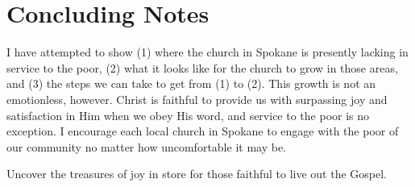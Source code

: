 \documentclass[12pt]{article}
\begin{document}
\section{Concluding Notes}

    \qChristianHedonism
    I have attempted to show (1) where the church in Spokane is presently lacking in service to the poor, (2) what it looks like for the church to grow in those areas, and (3) the steps we can take to get from (1) to (2).
    This growth is not an emotionless, however.
    Christ is faithful to provide us with surpassing joy and satisfaction in Him when we obey His word, and service to the poor is no exception.
    I encourage each local church in Spokane to engage with the poor of our community no matter how uncomfortable it may be.
    \par Uncover the treasures of joy in store for those faithful to live out the Gospel.

{}

\end{document}
